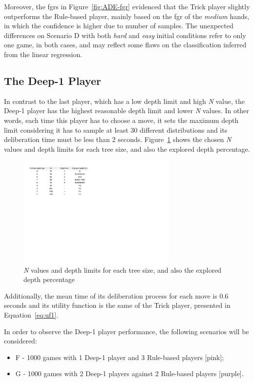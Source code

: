 Moreover, the \acp{fgr} in Figure~\ref{fig:ADE-fgr} evidenced that the Trick player slightly outperforms the Rule-based player, mainly based on the \ac{fgr} of the \emph{medium} hands, in which the confidence is higher due to number of samples.
The unexpected differences on Scenario D with both \emph{hard} and \emph{easy} initial conditions refer to only one game, in both cases, and may reflect some flaws on the classification inferred from the linear regression.



\subsection{The Deep-1 Player}

In contrast to the last player, which has a low depth limit and high \emph{N} value, the Deep-1 player has the highest reasonable depth limit and lower \emph{N} values.
In other words, each time this player has to choose a move, it sets the maximum depth limit considering it has to sample at least 30 different distributions and its deliberation time must be less than 2 seconds.
Figure~\ref{fig:nDepthLimits} shows the chosen \emph{N} values and depth limits for each tree size, and also the explored depth percentage.

\begin{figure}[h!]
  \centering
    \includegraphics[width=0.7\textwidth]{./img/4/nDepthLimits}
  \caption{\emph{N} values and depth limits for each tree size, and also the explored depth percentage}
\label{fig:nDepthLimits}
\end{figure}
Additionally, the mean time of its deliberation process for each move is 0.6 seconds and its utility function is the same of the Trick player, presented in Equation~\ref{eq:uf1}.

In order to observe the Deep-1 player performance, the following scenarios will be considered:
\begin{itemize}
\item F - 1000 games with 1 Deep-1 player and 3 Rule-based players [pink];
\item G - 1000 games with 2 Deep-1 players against 2 Rule-based players [purple].
\end{itemize}

